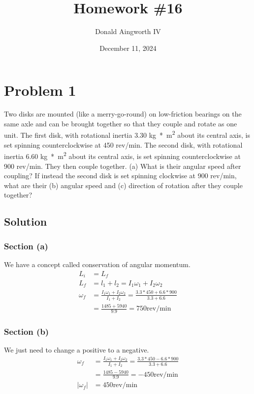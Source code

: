 \documentclass[12pt]{article}
\title{Homework \#16}
\author{Donald Aingworth IV}
\date{December 11, 2024}
\begin{document}

\maketitle

\pagebreak
\section{Problem 1}
Two disks are mounted (like a merry-go-round) on low-friction bearings on the same axle and can be brought together so that they couple and rotate as one unit. The first disk, with rotational inertia 3.30 \unit{\kilo\gram*\meter^2} about its central axis, is set spinning counterclockwise at 450 rev/min. The second disk, with rotational inertia 6.60 \unit{\kilo\gram*\meter^2} about its central axis, is set spinning counterclockwise at 900 rev/min. They then couple together. (a) What is their angular speed after coupling? If instead the second disk is set spinning clockwise at 900 rev/min, what are their (b) angular speed and (c) direction of rotation after they couple together?

\subsection{Solution}
\subsubsection{Section (a)}
We have a concept called conservation of angular momentum. 
\begin{align}
    L_i &=  L_f\\
    L_f &=  l_1 + l_2
        =   I_1\omega_1 + I_2\omega_2\\
    \omega_f    &=  \frac{I_1\omega_1 + I_2\omega_2}{I_1 + I_2}
        =   \frac{3.3*450 + 6.6*900}{3.3 + 6.6}\\
        &=  \frac{1485 + 5940}{9.9}
        =   \boxed{750\text{rev/min}}
\end{align}

\subsubsection{Section (b)}
We just need to change a positive to a negative. 
\begin{align}
    \omega_f    &=  \frac{I_1\omega_1 + I_2\omega_2}{I_1 + I_2}
        =   \frac{3.3*450 - 6.6*900}{3.3 + 6.6}\\
        &=  \frac{1485 - 5940}{9.9}
        =   -450\text{rev/min}\\
    |\omega_f|  &=  \boxed{450\text{rev/min}}
\end{align}
\end{document}
